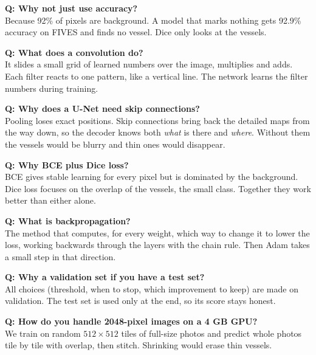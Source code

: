 \documentclass[11pt,a4paper]{article}
\begin{document}
\begin{prof}\textbf{Q: Why not just use accuracy?}\\
Because 92\% of pixels are background. A model that marks nothing gets 92.9\% accuracy on FIVES and finds no vessel. Dice only looks at the vessels.\end{prof}

\begin{prof}\textbf{Q: What does a convolution do?}\\
It slides a small grid of learned numbers over the image, multiplies and adds. Each filter reacts to one pattern, like a vertical line. The network learns the filter numbers during training.\end{prof}

\begin{prof}\textbf{Q: Why does a U-Net need skip connections?}\\
Pooling loses exact positions. Skip connections bring back the detailed maps from the way down, so the decoder knows both \emph{what} is there and \emph{where}. Without them the vessels would be blurry and thin ones would disappear.\end{prof}

\begin{prof}\textbf{Q: Why BCE plus Dice loss?}\\
BCE gives stable learning for every pixel but is dominated by the background. Dice loss focuses on the overlap of the vessels, the small class. Together they work better than either alone.\end{prof}

\begin{prof}\textbf{Q: What is backpropagation?}\\
The method that computes, for every weight, which way to change it to lower the loss, working backwards through the layers with the chain rule. Then Adam takes a small step in that direction.\end{prof}

\begin{prof}\textbf{Q: Why a validation set if you have a test set?}\\
All choices (threshold, when to stop, which improvement to keep) are made on validation. The test set is used only at the end, so its score stays honest.\end{prof}

\begin{prof}\textbf{Q: How do you handle 2048-pixel images on a 4 GB GPU?}\\
We train on random $512\times512$ tiles of full-size photos and predict whole photos tile by tile with overlap, then stitch. Shrinking would erase thin vessels.\end{prof}
\end{document}
